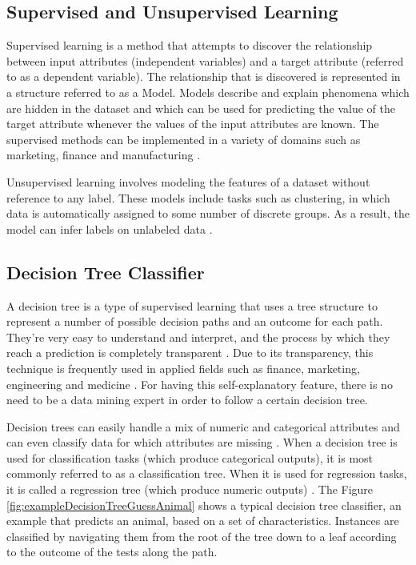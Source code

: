 \subsection{Supervised and Unsupervised Learning}

Supervised learning is a method that attempts to discover the relationship between input attributes (independent variables) and a target attribute (referred to as a dependent variable).
The relationship that is discovered is represented in a structure referred
to as a Model. Models describe and explain phenomena which are
hidden in the dataset and which can be used for predicting the value of
the target attribute whenever the values of the input attributes are known.
The supervised methods can be implemented in a variety of domains such
as marketing, finance and manufacturing  \cite{rokach2008data}. 

Unsupervised learning involves modeling the features of a dataset without reference to any label. These models include tasks such as clustering, in which data is automatically assigned to some number of discrete groups. As a result, the model can infer labels on unlabeled data \cite{vanderplas2016python}.

\subsection{Decision Tree Classifier}

A decision tree is a type of supervised learning that uses a tree structure to represent a number of possible decision paths and
an outcome for each path. They’re very easy to understand and
interpret, and the process by which they reach a prediction is completely transparent \cite{grus2019data}. Due to its transparency, this technique is frequently
used in applied fields such as finance, marketing, engineering and medicine \cite{rokach2008data}. For having this self-explanatory feature, there is
no need to be a data mining expert in order to follow a certain decision
tree. \cite{rokach2008data}

Decision trees can easily handle a mix of
numeric and categorical attributes and
can even classify data for which attributes are missing \cite{grus2019data}.
When a decision tree is used for classification tasks  (which produce categorical
outputs), it is most commonly referred to as a classification tree. When it is used for regression tasks, it is
called a regression tree  (which produce numeric outputs) \cite{rokach2008data}. The Figure \ref{fig:exampleDecisionTreeGuessAnimal} shows a typical decision tree classifier, an example that predicts an animal, based on a set of characteristics. Instances are classified by navigating them from the root of the tree
down to a leaf according to the outcome of the tests along the path. 

